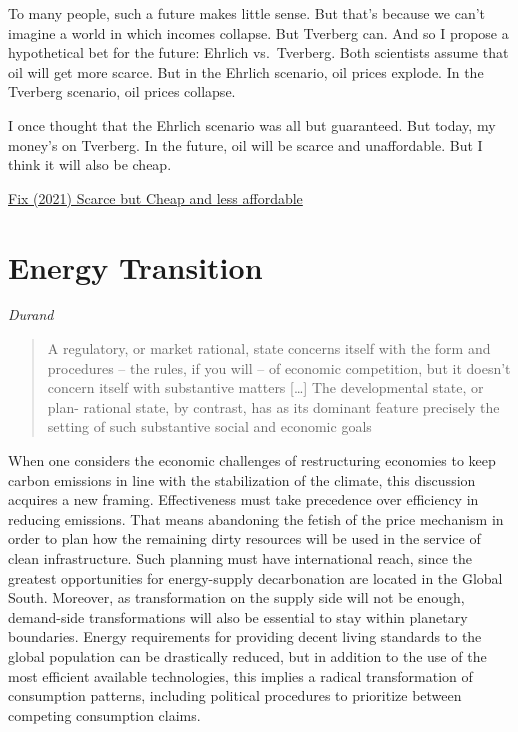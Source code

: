 \documentclass[
]{book}
\begin{document}
To many people, such a future makes little sense. But that's because we can't imagine a world in which incomes collapse. But Tverberg can. And so I propose a hypothetical bet for the future: Ehrlich vs.~Tverberg. Both scientists assume that oil will get more scarce. But in the Ehrlich scenario, oil prices explode. In the Tverberg scenario, oil prices collapse.

I once thought that the Ehrlich scenario was all but guaranteed. But today, my money's on Tverberg. In the future, oil will be scarce and unaffordable. But I think it will also be cheap.

\href{https://economicsfromthetopdown.com/2020/12/03/as-we-exhaust-our-oil-it-will-get-cheaper-but-less-affordable/}{Fix (2021) Scarce but Cheap and less affordable}

\hypertarget{energy-transition}{%
\section{Energy Transition}\label{energy-transition}}

\emph{Durand}

\begin{quote}
A regulatory, or market rational, state concerns itself with
the form and procedures -- the rules, if you will -- of
economic competition, but it doesn't concern itself with
substantive matters {[}\ldots{]} The developmental state, or plan-
rational state, by contrast, has as its dominant feature
precisely the setting of such substantive social and economic
goals
\end{quote}

When one considers the economic challenges of restructuring
economies to keep carbon emissions in line with the stabilization
of the climate, this discussion acquires a new framing.
Eﬀectiveness must take precedence over eﬃciency in reducing
emissions. That means abandoning the fetish of the price
mechanism in order to plan how the remaining dirty resources
will be used in the service of clean infrastructure. Such planning
must have international reach, since the greatest opportunities for
energy-supply decarbonation are located in the Global South.
Moreover, as transformation on the supply side will not be
enough, demand-side transformations will also be essential to
stay within planetary boundaries. Energy requirements for
providing decent living standards to the global population can be
drastically reduced, but in addition to the use of the most eﬃcient
available technologies, this implies a radical transformation of
consumption patterns, including political procedures to prioritize
between competing consumption claims.
\end{document}
